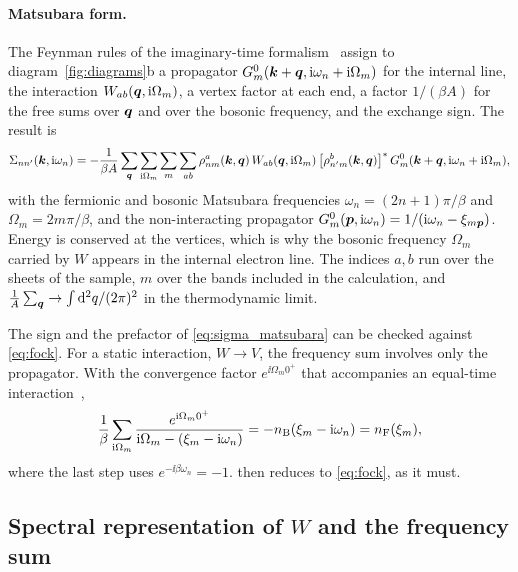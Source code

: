 \paragraph{Matsubara form.} The Feynman rules of the imaginary-time
formalism~\cite{Mahan,BruusFlensberg,FetterWalecka} assign to diagram~\ref{fig:diagrams}b a propagator
$G^0_m(\bm k+\bm q,\mathrm i\omega_n+\mathrm i\Omega_m)$ for the internal line, the interaction $W_{ab}(\bm q,\mathrm i\Omega_m)$, a vertex
factor at each end, a factor $1/(\beta A)$ for the free sums over $\bm q$ and over the bosonic frequency, and the
exchange sign. The result is
\begin{equation}
\Sigma_{nn'}(\bm k,\mathrm i\omega_n)=-\frac1{\beta A}\sum_{\bm q}\sum_{\mathrm i\Omega_m}\sum_m\sum_{ab}
\rho^a_{nm}(\bm k,\bm q)\,W_{ab}(\bm q,\mathrm i\Omega_m)\,\bigl[\rho^b_{n'm}(\bm k,\bm q)\bigr]^*\,
G^0_m(\bm k+\bm q,\mathrm i\omega_n+\mathrm i\Omega_m),
\label{eq:sigma_matsubara}
\end{equation}
with the fermionic and bosonic Matsubara frequencies $\omega_n=(2n+1)\pi/\beta$ and $\Omega_m=2m\pi/\beta$, and the
non-interacting propagator $G^0_m(\bm p,\mathrm i\omega_n)=1/(\mathrm i\omega_n-\xi_{m\bm p})$. Energy is conserved at the vertices,
which is why the bosonic frequency $\Omega_m$ carried by $W$ appears in the internal electron line. The
indices $a,b$ run over the sheets of the sample, $m$ over the bands included in the calculation, and
$\frac1A\sum_{\bm q}\to\int\mathrm d^2q/(2\pi)^2$ in the thermodynamic limit.

The sign and the prefactor of \cref{eq:sigma_matsubara} can be checked against \cref{eq:fock}. For a static
interaction, $W\to V$, the frequency sum involves only the propagator. With the convergence factor
$e^{\ii\Omega_m0^+}$ that accompanies an equal-time interaction~\cite{Mahan},
\begin{equation}
\frac1\beta\sum_{\mathrm i\Omega_m}\frac{e^{\mathrm i\Omega_m0^+}}{\mathrm i\Omega_m-(\xi_m-\mathrm i\omega_n)}=-n_{\rm B}(\xi_m-\mathrm i\omega_n)=n_{\rm F}(\xi_m),
\end{equation}
where the last step uses $e^{-\ii\beta\omega_n}=-1$.  then reduces to \cref{eq:fock}, as it
must.

\subsection{Spectral representation of $W$ and the frequency sum}

